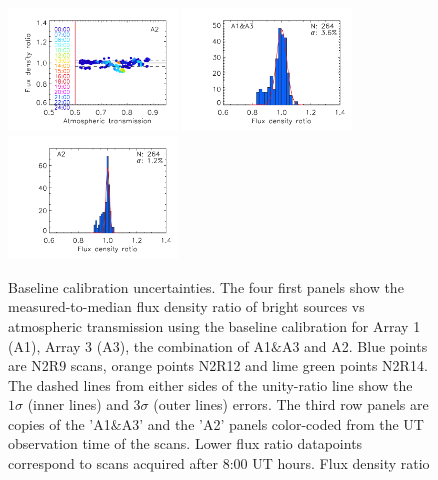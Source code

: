 \begin{figure}[ht!]
\begin{center}
    \includegraphics[clip=true, trim={0.9cm, 0.2cm, 0, 0.6cm},width=0.4\textwidth]{Figures/Calibration/plot_flux_density_ratio_obstau_allbright_obsdate_corrected_skydip_narrow_a2.pdf}
    \includegraphics[clip=true, trim={0.9cm, 0.4cm, 0, 0.6cm},width=0.4\textwidth]{Figures/Calibration/plot_histo_flux_density_ratio_obstau_allbright_corrected_skydip_narrow_1mm.pdf}
    \includegraphics[clip=true, trim={0.9cm, 0.4cm, 0, 0.6cm},width=0.4\textwidth]{Figures/Calibration/plot_histo_flux_density_ratio_obstau_allbright_corrected_skydip_narrow_a2.pdf}
    \vspace{-0.7mm}
    \caption[Baseline calibration rms error estimate]{\small{Baseline
      calibration uncertainties. The four first panels show the
      measured-to-median flux density ratio of bright sources vs
      atmospheric transmission using the baseline calibration for
      Array 1 (A1), Array 3 (A3), the combination of A1$\&$A3 and
      A2. Blue points are N2R9 scans, orange points N2R12 and lime
      green points N2R14. The dashed lines from either sides of the
      unity-ratio line
      show the $1\sigma$ (inner lines) and $3\sigma$ (outer lines) errors.
      The third row panels are copies of the 'A1$\&$A3' and the
      'A2' panels color-coded from the UT observation time of the
      scans. Lower flux ratio datapoints correspond to
      scans acquired after 8:00 UT hours. Flux density ratio
}}
\end{center}
\end{figure}
